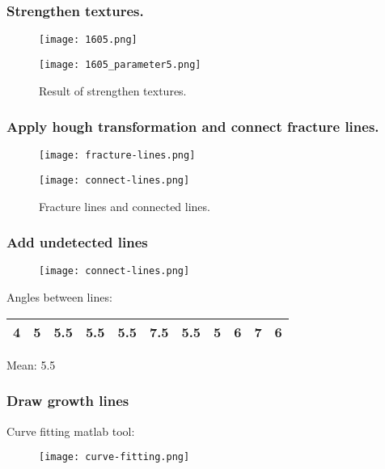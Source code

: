 \documentclass[notheorems,mathserif,table,compress]{beamer}  %
\begin{document}
\begin{frame}
  \frametitle{Strengthen textures.}
  \begin{figure}[!ht]
  \begin{minipage}[t]{0.4\textwidth}
  \centering
  \texttt{[image: 1605.png]}
  \end{minipage}
  \begin{minipage}[t]{0.4\textwidth}
  \texttt{[image: 1605\_parameter5.png]}
  \end{minipage}
  \caption{Result of strengthen textures.}
  \end{figure} 
\end{frame}

\begin{frame}
  \frametitle{Apply hough transformation and connect fracture lines.}
  \begin{figure}[!ht]
  \begin{minipage}[t]{0.4\textwidth}
  \centering
  \texttt{[image: fracture-lines.png]}
  \end{minipage}
  \begin{minipage}[t]{0.4\textwidth}
  \texttt{[image: connect-lines.png]}
  \end{minipage}
  \caption{Fracture lines and connected lines.}
  \end{figure} 
\end{frame}

\begin{frame}
  \frametitle{Add undetected lines}
  \begin{figure}[!ht]
  \centering\texttt{[image: connect-lines.png]}
  \end{figure} 
  Angles between lines:
  \begin{table}
  \begin{tabular}{|c|c|c|c|c|c|c|c|c|c|c|}
  \hline
  4&5&5.5&5.5&5.5&7.5&5.5&5&6&7&6\\
  \hline
  \end{tabular}
  \end{table}
 Mean: 5.5
\end{frame}

\begin{frame}
  \frametitle{Draw growth lines}
   Curve fitting matlab tool:
  \begin{figure}[!ht]
  \centering\texttt{[image: curve-fitting.png]}
  \end{figure} 
\end{frame}
\end{document}
